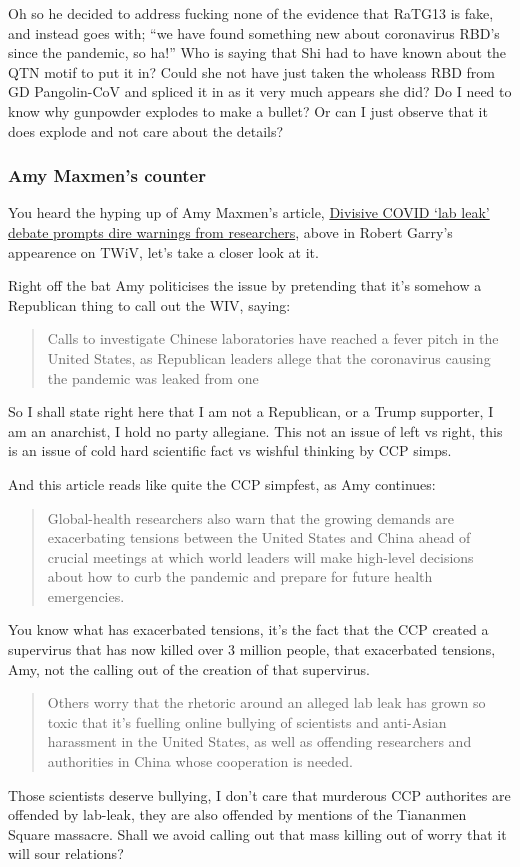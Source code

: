 \documentclass[11pt]{article}
\begin{document}
Oh so he decided to address fucking none of the evidence that RaTG13 is fake, and instead goes with; ``we have found something new about coronavirus RBD's since the pandemic, so ha!'' Who is saying that Shi had to have known about the QTN motif to put it in? Could she not have just taken the wholeass RBD from GD Pangolin-CoV and spliced it in as it very much appears she did? Do I need to know why gunpowder explodes to make a bullet? Or can I just observe that it does explode and not care about the details?
\subsubsection{Amy Maxmen's counter}
\label{sec:orgb4ba80c}
You heard the hyping up of Amy Maxmen's article, \href{https://www.nature.com/articles/d41586-021-01383-3}{Divisive COVID ‘lab leak’ debate prompts dire warnings from researchers}, above in Robert Garry's appearence on TWiV, let's take a closer look at it.

Right off the bat Amy politicises the issue by pretending that it's somehow a Republican thing to call out the WIV, saying:
\begin{quote}
Calls to investigate Chinese laboratories have reached a fever pitch in the United States, as Republican leaders allege that the coronavirus causing the pandemic was leaked from one
\end{quote}
So I shall state right here that I am not a Republican, or a Trump supporter, I am an anarchist, I hold no party allegiane. This not an issue of left vs right, this is an issue of cold hard scientific fact vs wishful thinking by CCP simps.

And this article reads like quite the CCP simpfest, as Amy continues:
\begin{quote}
Global-health researchers also warn that the growing demands are exacerbating tensions between the United States and China ahead of crucial meetings at which world leaders will make high-level decisions about how to curb the pandemic and prepare for future health emergencies.
\end{quote}
You know what has exacerbated tensions, it's the fact that the CCP created a supervirus that has now killed over 3 million people, that exacerbated tensions, Amy, not the calling out of the creation of that supervirus.

\begin{quote}
Others worry that the rhetoric around an alleged lab leak has grown so toxic that it’s fuelling online bullying of scientists and anti-Asian harassment in the United States, as well as offending researchers and authorities in China whose cooperation is needed.
\end{quote}
Those scientists deserve bullying, I don't care that murderous CCP authorites are offended by lab-leak, they are also offended by mentions of the Tiananmen Square massacre. Shall we avoid calling out that mass killing out of worry that it will sour relations?
\end{document}
